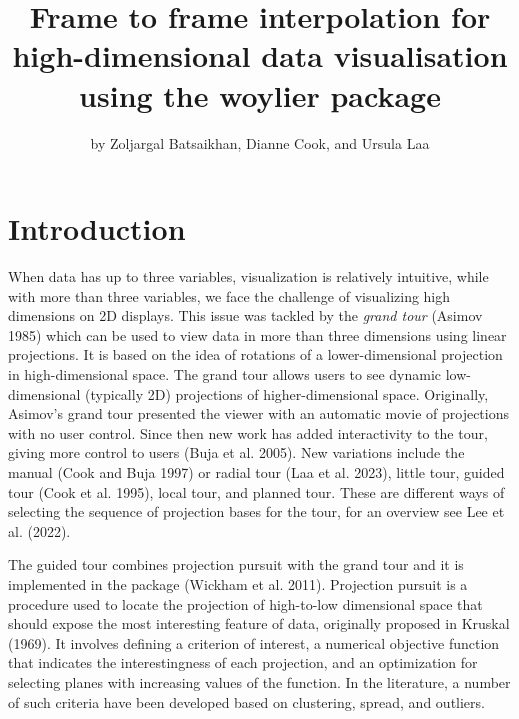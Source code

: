 \title{Frame to frame interpolation for high-dimensional data visualisation using the woylier package}


\author{by Zoljargal Batsaikhan, Dianne Cook, and Ursula Laa}

\maketitle


\hypertarget{introduction}{%
\section{Introduction}\label{introduction}}

When data has up to three variables, visualization is relatively intuitive, while with more than three variables, we face the challenge of visualizing high dimensions on 2D displays. This issue was tackled by the \emph{grand tour} (Asimov 1985) which can be used to view data in more than three dimensions using linear projections. It is based on the idea of rotations of a lower-dimensional projection in high-dimensional space. The grand tour allows users to see dynamic low-dimensional (typically 2D) projections of higher-dimensional space. Originally, Asimov's grand tour presented the viewer with an automatic movie of projections with no user control. Since then new work has added interactivity to the tour, giving more control to users (Buja et al. 2005). New variations include the manual (Cook and Buja 1997) or radial tour (Laa et al. 2023), little tour, guided tour (Cook et al. 1995), local tour, and planned tour. These are different ways of selecting the sequence of projection bases for the tour, for an overview see Lee et al. (2022).

The guided tour combines projection pursuit with the grand tour and it is implemented in the  package (Wickham et al. 2011). Projection pursuit is a procedure used to locate the projection of high-to-low dimensional space that should expose the most interesting feature of data, originally proposed in Kruskal (1969). It involves defining a criterion of interest, a numerical objective function that indicates the interestingness of each projection, and an optimization for selecting planes with increasing values of the function. In the literature, a number of such criteria have been developed based on clustering, spread, and outliers.


